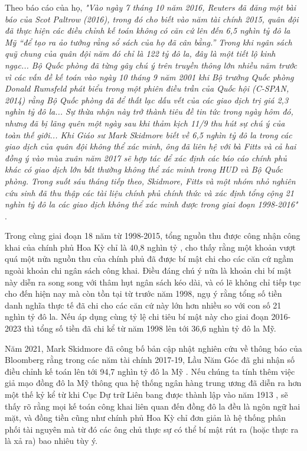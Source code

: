 \documentclass[10pt,twocolumn,letterpaper]{article}
\begin{document}
Theo báo cáo của họ, \textit{"Vào ngày 7 tháng 10 năm 2016, Reuters đã đăng một bài báo của Scot Paltrow (2016), trong đó cho biết vào năm tài chính 2015, quân đội đã thực hiện các điều chỉnh kế toán không có căn cứ lên đến 6,5 nghìn tỷ đô la Mỹ “để tạo ra ảo tưởng rằng sổ sách của họ đã cân bằng.” Trong khi ngân sách quỹ chung của quân đội năm đó chỉ là 122 tỷ đô la, đây là một tiết lộ kinh ngạc... Bộ Quốc phòng đã từng gây chú ý trên truyền thông lớn nhiều năm trước vì các vấn đề kế toán vào ngày 10 tháng 9 năm 2001 khi Bộ trưởng Quốc phòng Donald Rumsfeld phát biểu trong một phiên điều trần của Quốc hội (C-SPAN, 2014) rằng Bộ Quốc phòng đã để thất lạc dấu vết của các giao dịch trị giá 2,3 nghìn tỷ đô la... Sự thừa nhận này trở thành tiêu đề tin tức trong ngày hôm đó, nhưng đã bị lãng quên một ngày sau khi thảm kịch 11/9 thu hút sự chú ý của toàn thế giới... Khi Giáo sư Mark Skidmore biết về 6,5 nghìn tỷ đô la trong các giao dịch của quân đội không thể xác minh, ông đã liên hệ với bà Fitts và cả hai đồng ý vào mùa xuân năm 2017 sẽ hợp tác để xác định các báo cáo chính phủ khác có giao dịch lớn bất thường không thể xác minh trong HUD và Bộ Quốc phòng. Trong suốt sáu tháng tiếp theo, Skidmore, Fitts và một nhóm nhỏ nghiên cứu sinh đã thu thập các tài liệu chính phủ chính thức và xác định tổng cộng 21 nghìn tỷ đô la các giao dịch không thể xác minh được trong giai đoạn 1998-2016"} \cite{12}.

Trong cùng giai đoạn 18 năm từ 1998-2015, tổng nguồn thu được công nhận công khai của chính phủ Hoa Kỳ chỉ là 40,8 nghìn tỷ \cite{15}, cho thấy rằng một khoản vượt quá một nửa nguồn thu của chính phủ đã được bí mật chi cho các căn cứ ngầm ngoài khoản chi ngân sách công khai. Điều đáng chú ý nữa là khoản chi bí mật này diễn ra song song với thâm hụt ngân sách kéo dài, và có lẽ không chỉ tiếp tục cho đến hiện nay mà còn tồn tại từ trước năm 1998, ngụ ý rằng tổng số tiền danh nghĩa thực tế đã chi cho các căn cứ này lớn hơn nhiều so với con số 21 nghìn tỷ đô la. Nếu áp dụng cùng tỷ lệ chi tiêu bí mật này cho giai đoạn 2016-2023 thì tổng số tiền đã chi kể từ năm 1998 lên tới 36,6 nghìn tỷ đô la Mỹ.

Năm 2021, Mark Skidmore đã công bố bản cập nhật nghiên cứu về thông báo của Bloomberg rằng trong các năm tài chính 2017-19, Lầu Năm Góc đã ghi nhận số điều chỉnh kế toán lên tới 94,7 nghìn tỷ đô la Mỹ \cite{17,18}. Nếu chúng ta tính thêm việc giả mạo đồng đô la Mỹ thông qua hệ thống ngân hàng trung ương đã diễn ra hơn một thế kỷ kể từ khi Cục Dự trữ Liên bang được thành lập vào năm 1913 \cite{37}, sẽ thấy rõ rằng mọi kế toán công khai liên quan đến đồng đô la đều là ngôn ngữ hai mặt, và đồng tiền cũng như chính phủ Hoa Kỳ chỉ đơn giản là hệ thống phân phối tài nguyên mà từ đó các ông chủ thực sự có thể bí mật rút ra (hoặc thực ra là xả ra) bao nhiêu tùy ý.
\end{document}
